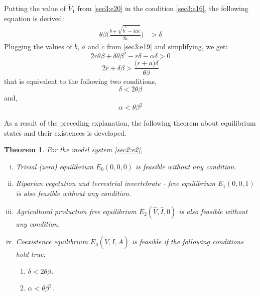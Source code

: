 \documentclass[12pt]{article}
\newtheorem{theorem}{Theorem}[section]
\numberwithin{equation}{section}
\begin{document}
\begin{enumerate}[i)]
Putting the value of $\tilde V_1$ from \eqref{sec3:e20} in the condition \eqref{sec3:e16}, the following equation is derived:
\begin{align}\label{sec3:e23}
\theta \beta \bigg(  \frac{\tilde b + \sqrt{\tilde b^2 - 4\tilde a \tilde c}}{2 \tilde a} \bigg) &> \delta 
\end{align}
Plugging the values of $\tilde b$, $\tilde a$ and $\tilde c$ from \eqref{sec3:e19} and simplifying, we get:
\begin{equation}\label{sec3:e24}
2r \theta \beta + \delta \theta \beta^2 - r\delta -\alpha \delta>0
\end{equation}
\begin{equation}\label{sec3:e25}
2r + \delta \beta >\frac{\bigg(r+a\bigg)\delta}{\theta \beta}
\end{equation}
that is equivalent to the following two conditions,
\begin{equation}\label{sec3:e26}
\delta < 2 \theta \beta
\end{equation}
and,
\begin{equation}\label{sec3:e27}
\alpha < \theta \beta^2
\end{equation}
\end{enumerate}
As a result of the preceding explanation, the following theorem about equilibrium states and their existences is developed.
\begin{theorem}\label{Theorem 3.3}
For the model system \eqref{sec2:e2},
\begin{enumerate}[i.)]
\item Trivial (zero) equilibrium $E_0(0,0,0)$ is feasible without any condition.
\item Riparian vegetation and terrestrial invertebrate - free equilibrium $E_1(0,0,1)$ is also feasible without any condition.
\item Agricultural production free equilibrium $E_2(\hat V, \hat I, 0)$ is also feasible without any condition.
\item Coexistence equilibrium  $E_3(\tilde V, \tilde I, \tilde A)$ is feasible if  the following conditions hold true:
\begin{enumerate}
     \item $\delta < 2 \theta \beta$.
     \item $\alpha < \theta \beta^2$.
\end{enumerate}
\end{enumerate}
\end{theorem}
\vspace{-1cm}
\end{document}
